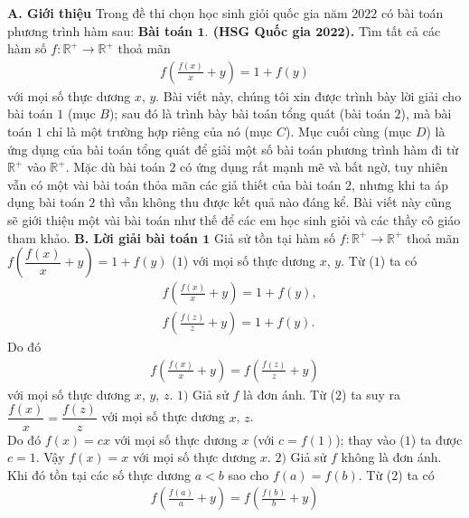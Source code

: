 \begin{multicols}{2}
	\textbf{\color{hoccungpi}A. Giới thiệu}
	\vskip 0.1cm
	Trong đề thi chọn học sinh giỏi quốc gia năm $2022$ có bài toán phương trình hàm sau:
	\vskip 0.1cm
	\textbf{\color{hoccungpi}Bài toán $\pmb{1.}$ (HSG Quốc gia $\pmb{2022}$).}
	Tìm tất cả các hàm số $f:\mathbb{R^+}  \rightarrow\mathbb{R^+} $ thoả mãn
	\begin{align*}
		f\left(\frac{f(x)}{x}+y\right)=1+f(y)
	\end{align*}
	với mọi số thực dương $x$, $y$.
	\vskip 0.1cm
	Bài viết này, chúng tôi xin được trình bày lời giải cho bài toán $1$ (mục $B$); sau đó là trình bày bài toán tổng quát (bài toán $2$), mà bài toán $1$ chỉ là một trường hợp riêng của nó (mục $C$). Mục cuối cùng (mục $D$) là ứng dụng của bài toán tổng quát để giải một số bài toán phương trình hàm đi từ $\mathbb R^+$ vào $\mathbb R^+$. 
	Mặc dù bài toán $2$ có ứng dụng rất mạnh mẽ và bất ngờ, tuy nhiên vẫn có một vài bài toán thỏa mãn các giả thiết của bài toán $2$, nhưng khi ta áp dụng bài toán  $2$ thì vẫn không thu được kết quả nào đáng kể. Bài viết này cũng sẽ giới thiệu một vài bài toán như thế để các em học sinh giỏi và các thầy cô giáo tham khảo.
	\vskip 0.1cm
	\textbf{\color{hoccungpi}B. Lời giải bài toán $\pmb{1}$}
	\vskip 0.1cm
	Giả sử tồn tại hàm số 
	$f:\mathbb{R^+}  \rightarrow\mathbb{R^+} $ thoả mãn
	\vskip 0.1cm
	\hspace*{40pt}$f\left(\dfrac{f(x)}{x}+y\right)=1+f(y)$ \hfill ($1$)
	\vskip 0.1cm
	với mọi số thực dương $x$, $y$.
	Từ ($1$) ta có
	\begin{align*}
		&f\left( {\frac{{f(x)}}{x} + y} \right)=1+f(y),\\
		&f\left( {\frac{{f(z)}}{z} + y} \right)=1+f(y).
	\end{align*}Do đó 
	\begin{align*}
		f\left( {\frac{{f(x)}}{x} + y} \right) = f\left( {\frac{{f(z)}}{z} + y} \right)\tag{$2$}
	\end{align*}
	với mọi số thực dương $x$, $y$, $z$.
	\vskip 0.1cm
	$1)$ Giả sử $f$ là đơn ánh.
	Từ ($2$) ta suy ra
	$\dfrac{{f(x)}}{x} = \dfrac{{f(z)}}{z}$ với mọi số thực dương $x$, $z$.\\
	Do đó $f(x) = cx$ với mọi số thực dương $x$ (với $c=f(1)$); thay vào ($1$) ta được
	$c=1$. Vậy
	$f(x) = x$ với mọi số thực dương $x$.
	\vskip 0.1cm
	$2)$ Giả sử $f$ không là đơn ánh.
	Khi đó tồn tại các số thực dương $a<b$ sao cho $f(a)=f(b)$.
	Từ ($2$) ta có
	\begin{align*}
		f\left( {\frac{{f(a)}}{a} + y} \right) = f\left( {\frac{{f(b)}}{b} + y} \right)

\end{align*}
\end{multicols}
